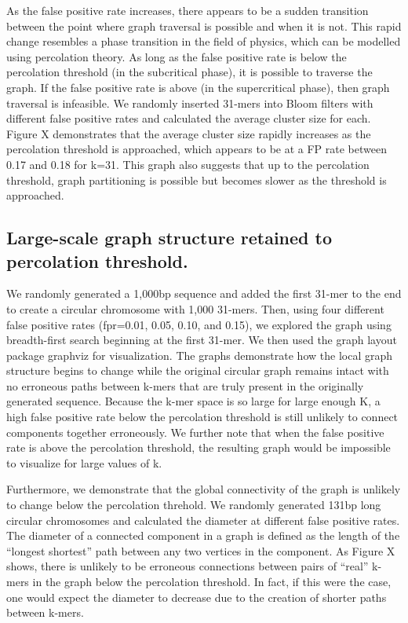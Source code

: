 \documentclass[12pt]{article} \usepackage{simplemargins}
\begin{document}
As the false positive rate increases, there appears to be a sudden
transition between the point where graph traversal is possible and
when it is not. This rapid change resembles a phase transition in the
field of physics, which can be modelled using percolation theory. As
long as the false positive rate is below the percolation threshold (in
the subcritical phase), it is possible to traverse the graph. If the
false positive rate is above (in the supercritical phase), then graph
traversal is infeasible. We randomly inserted 31-mers into Bloom
filters with different false positive rates and calculated the average
cluster size for each. Figure X demonstrates that the average cluster
size rapidly increases as the percolation threshold is approached,
which appears to be at a FP rate between 0.17 and 0.18 for k=31. This
graph also suggests that up to the percolation threshold, graph
partitioning is possible but becomes slower as the threshold is
approached.

\subsection{Large-scale graph structure retained to percolation threshold.} We
randomly generated a 1,000bp sequence and added the first 31-mer to
the end to create a circular chromosome with 1,000 31-mers. Then,
using four different false positive rates (fpr=0.01, 0.05, 0.10, and
0.15), we explored the graph using breadth-first search beginning at
the first 31-mer. We then used the graph
layout package graphviz for visualization. The graphs demonstrate how
the local graph structure begins to change while the original circular
graph remains intact with no erroneous paths between k-mers that are
truly present in the originally generated sequence. Because the k-mer
space is so large for large enough K, a high false positive rate below
the percolation threshold is still unlikely to connect components
together erroneously. We further note that when the false positive
rate is above the percolation threshold, the resulting graph would be
impossible to visualize for large values of k.

Furthermore, we demonstrate that the global connectivity of the graph is unlikely 
to change below the percolation threhold. We randomly generated 131bp long circular 
chromosomes and calculated the diameter at different false positive rates. The diameter 
of a connected component in a graph is defined as the length of the ``longest shortest'' 
path between any two vertices in the component. As Figure X shows, there is unlikely to 
be erroneous connections between pairs of ``real'' k-mers in the graph below the 
percolation threshold. In fact, if this were the case, one would expect the diameter 
to decrease due to the creation of shorter paths between k-mers.
\end{document}
